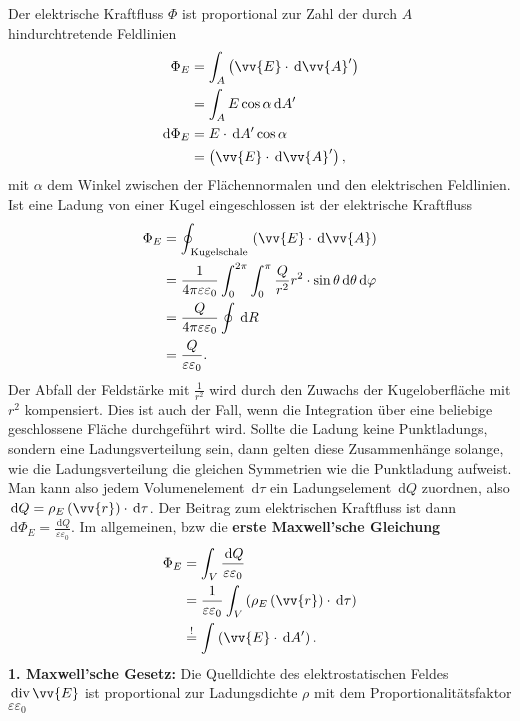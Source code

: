 \documentclass[a4paper,12pt]{article}
\newcommand{\td}{\,\text{d}}
\begin{document}
Der elektrische Kraftfluss $\Phi $ ist proportional zur Zahl der durch $A$ hindurchtretende Feldlinien
\begin{align*}
        \Phi _E&=\int_{A}^{}\left(\vv{E}\cdot \td \vv{A}'\right)\\
               &=\int_{A}^{}E\cos \alpha \td A'\\
        \td \Phi _E&=E\cdot \td A'\cos \alpha \\
                   &=\left(\vv{E}\cdot \td \vv{A}'\right)
,\end{align*}
mit $\alpha $ dem Winkel zwischen der Flächennormalen und den elektrischen Feldlinien. Ist eine Ladung von einer Kugel eingeschlossen ist der elektrische Kraftfluss
\begin{align*}
        \Phi _E&=\oint_{\,\text{Kugelschale}\,}^{}\left(\vv{E}\cdot \td \vv{A}\right)\\
               &=\dfrac{1}{4\pi \varepsilon \varepsilon _0}\int_{0}^{2\pi }\int_{0}^{\pi }\dfrac{Q}{r^2}r^2\cdot \sin \theta \td \theta \td \varphi \\
               &=\dfrac{Q}{4\pi \varepsilon \varepsilon _0}\oint_{}^{}\td R\\
               &=\dfrac{Q}{\varepsilon \varepsilon _0}
.\end{align*}
Der Abfall der Feldstärke mit $\tfrac{1}{r^2}$ wird durch den Zuwachs der Kugeloberfläche mit $r^2$ kompensiert. Dies ist auch der Fall, wenn die Integration über eine beliebige geschlossene Fläche durchgeführt wird. Sollte die Ladung keine Punktladungs, sondern eine Ladungsverteilung sein, dann gelten diese Zusammenhänge solange, wie die Ladungsverteilung die gleichen Symmetrien wie die Punktladung aufweist. Man kann also jedem Volumenelement $\td \tau $ ein Ladungselement $\td Q$ zuordnen, also $\td Q=\rho _E\left(\vv{r}\right)\cdot \td \tau $. Der Beitrag zum elektrischen Kraftfluss ist dann $\td \Phi _E=\tfrac{\td Q}{\varepsilon \varepsilon _0}$. Im allgemeinen, bzw die \textbf{erste Maxwell'sche Gleichung}
\begin{align*}
        \Phi _E&=\int_{V}^{}\dfrac{\td Q}{\varepsilon \varepsilon _0}\\
               &=\dfrac{1}{\varepsilon \varepsilon _0}\int_{V}^{}\left(\rho _E\left(\vv{r}\right)\cdot \td \tau \right)\\
               &\stackrel{!}{=}\int_{}^{}\left(\vv{E}\cdot \td A'\right)
.\end{align*}
\textbf{1. Maxwell'sche Gesetz:} Die Quelldichte des elektrostatischen Feldes $\,\text{div}\,\vv{E}$ ist proportional zur Ladungsdichte $\rho $ mit dem Proportionalitätsfaktor $\varepsilon \varepsilon _0$ 
\end{document}
